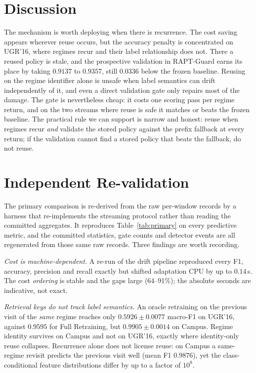 \section{Discussion}


The mechanism is worth deploying when there is recurrence. The cost saving appears
wherever reuse occurs, but the accuracy penalty is concentrated on UGR'16, where regimes
recur and their label relationship does not. There a reused policy is stale, and the
prospective validation in RAPT-Guard earns its place by taking $0.9137$ to $0.9357$, still
$0.0336$ below the frozen baseline. Reusing on the regime identifier alone is unsafe when
label semantics can drift independently of it, and even a direct validation gate only
repairs most of the damage. The gate is nevertheless cheap: it costs one scoring pass per
regime return, and on the two streams where reuse is safe it matches or beats the frozen
baseline. The practical rule we can support is narrow and honest: reuse when regimes
recur \emph{and} validate the stored policy against the prefix fallback at every return;
if the validation cannot find a stored policy that beats the fallback, do not reuse.


\section{Independent Re-validation}
\label{sec:revalidation}

The primary comparison is re-derived from the raw per-window records by a harness that
re-implements the streaming protocol rather than reading the committed aggregates. It
reproduces Table~\ref{tab:primary} on every predictive metric, and the committed
statistics, gate counts and detector events are all regenerated from those same raw
records. Three findings are worth recording.

\emph{Cost is machine-dependent.} A re-run of the drift pipeline reproduced every F1,
accuracy, precision and recall exactly but shifted adaptation CPU by up to $0.14$\,s. The
cost \emph{ordering} is stable and the gaps large (64--91\%); the absolute seconds are
indicative, not exact.

\emph{Retrieval keys do not track label semantics.} An oracle retraining on the previous
visit of the \emph{same} regime reaches only $0.5926 \pm 0.0077$ macro-F1 on UGR'16,
against $0.9595$ for Full Retraining, but $0.9905 \pm 0.0014$ on Campus. Regime identity
survives on Campus and not on UGR'16, exactly where identity-only reuse collapses.
Recurrence alone does not license reuse: on Campus a same-regime revisit predicts the
previous visit well (mean F1 $0.9876$), yet the class-conditional feature distributions
differ by up to a factor of $10^{8}$.

